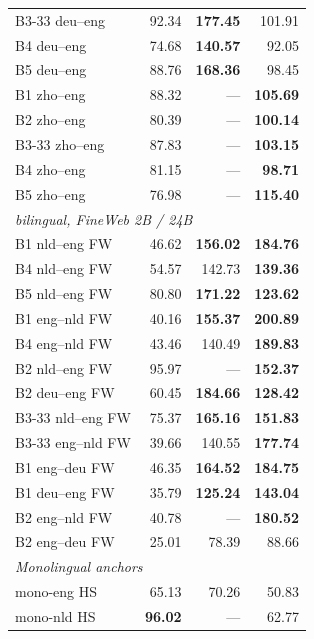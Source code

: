 \begin{table}[!ht]
\begin{tabular}{lrrr}
    B3-33 deu--eng        & 92.34 & \textbf{177.45} & 101.91 \\
    B4 deu--eng           & 74.68 & \textbf{140.57} & 92.05 \\
    B5 deu--eng           & 88.76 & \textbf{168.36} & 98.45 \\
    B1 zho--eng           & 88.32 & --- & \textbf{105.69} \\
    B2 zho--eng           & 80.39 & --- & \textbf{100.14} \\
    B3-33 zho--eng        & 87.83 & --- & \textbf{103.15} \\
    B4 zho--eng           & 81.15 & --- & \textbf{98.71} \\
    B5 zho--eng           & 76.98 & --- & \textbf{115.40} \\
    \midrule
    \multicolumn{4}{l}{\textit{\beetle{} bilingual, FineWeb 2B / 24B}} \\
    \midrule
    B1 nld--eng FW        & 46.62 & \textbf{156.02} & \textbf{184.76} \\
    B4 nld--eng FW        & 54.57 & 142.73 & \textbf{139.36} \\
    B5 nld--eng FW        & 80.80 & \textbf{171.22} & \textbf{123.62} \\
    B1 eng--nld FW        & 40.16 & \textbf{155.37} & \textbf{200.89} \\
    B4 eng--nld FW        & 43.46 & 140.49 & \textbf{189.83} \\
    B2 nld--eng FW        & 95.97 & --- & \textbf{152.37} \\
    B2 deu--eng FW        & 60.45 & \textbf{184.66} & \textbf{128.42} \\
    B3-33 nld--eng FW     & 75.37 & \textbf{165.16} & \textbf{151.83} \\
    B3-33 eng--nld FW     & 39.66 & 140.55 & \textbf{177.74} \\
    B1 eng--deu FW        & 46.35 & \textbf{164.52} & \textbf{184.75} \\
    B1 deu--eng FW        & 35.79 & \textbf{125.24} & \textbf{143.04} \\
    B2 eng--nld FW        & 40.78 & --- & \textbf{180.52} \\
    B2 eng--deu FW        & 25.01 & 78.39 & 88.66 \\
    \midrule
    \multicolumn{4}{l}{\textit{Monolingual \beetle{} anchors}} \\
    \midrule
    mono-eng HS           & 65.13 & 70.26 & 50.83 \\
    mono-nld HS           & \textbf{96.02} & --- & 62.77 \\

\end{tabular}
\end{table}
